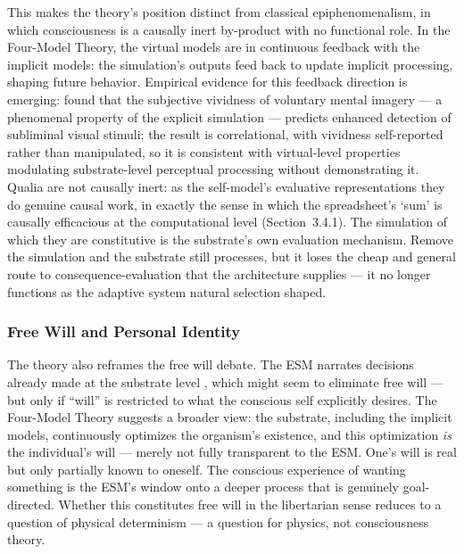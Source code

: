 \documentclass[12pt]{article}
\newcommand{\revstart}{}
\newcommand{\revend}{}
\begin{document}
This makes the theory's position distinct from classical epiphenomenalism, in which consciousness is a causally inert by-product with no functional role. In the Four-Model Theory, the virtual models are in continuous feedback with the implicit models: the simulation's outputs feed back to update implicit processing, shaping future behavior. Empirical evidence for this feedback direction is emerging: \citet{Byczynski2025} found that the subjective vividness of voluntary mental imagery --- a phenomenal property of the explicit simulation --- predicts enhanced detection of subliminal visual stimuli; the result is correlational, with vividness self-reported rather than manipulated, so it is consistent with virtual-level properties modulating substrate-level perceptual processing without demonstrating it. {\revstart Qualia are not causally inert: as the self-model's evaluative representations they do genuine causal work, in exactly the sense in which the spreadsheet's `sum' is causally efficacious at the computational level (Section~3.4.1). The simulation of which they are constitutive is the substrate's own evaluation mechanism. Remove the simulation and the substrate still processes, but it loses the cheap and general route to consequence-evaluation that the architecture supplies --- it no longer functions as the adaptive system natural selection shaped.\revend}


\subsubsection{Free Will and Personal Identity}


The theory also reframes the free will debate. The ESM narrates decisions already made at the substrate level \citep{Libet1985,Schurger2012,Wegner2002}, which might seem to eliminate free will --- but only if ``will'' is restricted to what the conscious self explicitly desires. The Four-Model Theory suggests a broader view: the substrate, including the implicit models, continuously optimizes the organism's existence, and this optimization \emph{is} the individual's will --- merely not fully transparent to the ESM. One's will is real but only partially known to oneself. The conscious experience of wanting something is the ESM's window onto a deeper process that is genuinely goal-directed. Whether this constitutes free will in the libertarian sense reduces to a question of physical determinism --- a question for physics, not consciousness theory.
\end{document}
